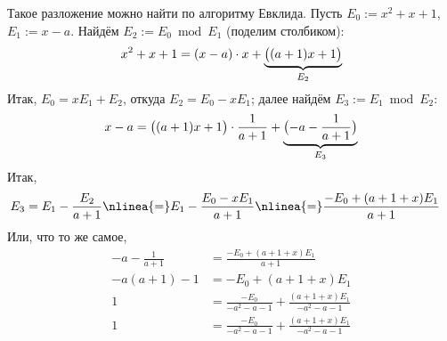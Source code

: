 \begin{example}
	Такое разложение можно найти по алгоритму Евклида. Пусть $E_0 := x^2 + x + 1$, $E_1 := x-a$. Найдём $E_2 := E_0 \bmod E_1$ (поделим столбиком):
	\[
		x^2 + x + 1 =
		(x-a) \cdot x +
		\underbrace{%
			\bigl( (a+1)x + 1 \bigr)
		}_{E_2}
	\]
	Итак, $E_0 = xE_1 + E_2$, откуда $E_2 = E_0 - xE_1$; далее найдём $E_3 := E_1 \bmod E_2$:
	\[
		x-a = 
		\bigl( (a+1)x + 1 \bigr)
		\cdot
		\frac{1}{a+1}
		+
		\underbrace{%
			\bigl(
				-a - \frac{1}{a+1}
			\bigr)
		}_{E_3}
	\]
	Итак,
	\begin{align*}
		E_3 &=
		E_1 - \frac{E_2}{a + 1}
		\nlinea{=}
		E_1 - \frac{E_0 - xE_1}{a + 1}
		\nlinea{=}
		\frac{-E_0 + (a+1+x)E_1}{a + 1}
	\end{align*}
	Или, что то же самое,
	\begin{align*}
		-a - \frac{1}{a+1} &=
		\frac{-E_0 + (a+1+x)E_1}{a + 1}
		\\
		-a(a+1) - 1 &=
		-E_0 + (a+1+x)E_1
		\\
		1 &=
		\frac{-E_0}{-a^2 - a - 1} +
		\frac{(a+1+x)E_1}{-a^2 - a - 1}
		\\
		1 &=
		\frac{-E_0}{-a^2 - a - 1} +
		\frac{(a+1+x)E_1}{-a^2 - a - 1}
	\end{align*}

\end{example}

